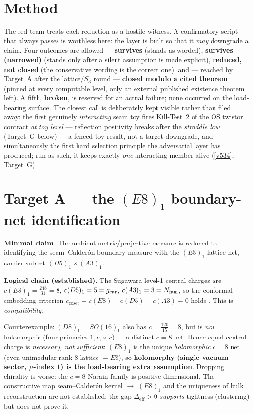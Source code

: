 \section*{Method}
The red team treats each reduction as a hostile witness. A confirmatory script that always passes
is worthless here: the layer is built so that it \emph{may} downgrade a claim. Four outcomes are
allowed --- \textbf{survives} (stands as worded), \textbf{survives (narrowed)} (stands only after a
silent assumption is made explicit), \textbf{reduced, not closed} (the conservative wording is
the correct one), and --- reached by Target~A after the lattice/$S_3$ round --- \textbf{closed modulo a cited
theorem} (pinned at every computable level, only an external published existence theorem left). A fifth,
\textbf{broken}, is reserved for an actual failure; none occurred on the load-bearing surface. The
closest call is deliberately kept visible rather than filed away: the first genuinely
\emph{interacting} seam toy fires Kill-Test~2 of the OS twistor contract \emph{at toy level} ---
reflection positivity breaks after the \emph{straddle law} (Target~G below) --- a fenced toy result,
not a target downgrade, and simultaneously the first hard selection principle the adversarial layer
has produced; run as such, it keeps exactly \emph{one} interacting member alive
(\vref{v534}, Target~G).

\section*{Target A --- the $(E8)_1$ boundary-net identification}\label{sec:A}
\noindent\textbf{Minimal claim.} The ambient metric/projective measure is reduced to identifying the
seam--Calder\'on boundary measure with the $(E8)_1$ lattice net, carrier subnet
$(D5)_1\times(A3)_1$.

\smallskip\noindent\textbf{Logical chain (established).} The Sugawara level-1 central charges are
$c(E8)_1=\tfrac{248}{31}=8$, $c(D5)_1=5=g_{\mathrm{car}}$, $c(A3)_1=3=N_{\mathrm{fam}}$, so the conformal-embedding
criterion $c_{\mathrm{coset}}=c(E8)-c(D5)-c(A3)=0$ holds \mE. This is \emph{compatibility}.

\begin{gapbox}
Counterexample: $(D8)_1=SO(16)_1$ also has $c=\tfrac{120}{15}=8$, but is \emph{not} holomorphic
(four primaries $1,v,s,c$) --- a distinct $c=8$ net. Hence equal central charge is \emph{necessary,
not sufficient}: $(E8)_1$ is the unique \emph{holomorphic} $c=8$ net (even unimodular rank-8
lattice $=E8$), so \textbf{holomorphy (single vacuum sector, $\mu$-index $1$) is the load-bearing
extra assumption}. Dropping chirality is worse: the $c=8$ Narain family is positive-dimensional.
The constructive map seam--Calder\'on kernel $\to$ $(E8)_1$ and the uniqueness of bulk
reconstruction are not established; the gap $\Delta_{\mathrm{eff}}>0$ \emph{supports} tightness
(clustering) but does not prove it.
\end{gapbox}


